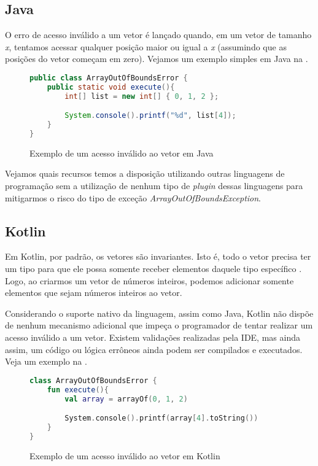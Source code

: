 \subsection{Java}

O erro de acesso inválido a um vetor é lançado quando, em um vetor de tamanho \textit{x}, tentamos acessar qualquer posição maior ou igual a \textit{x} (assumindo que as posições do vetor começam em zero). Vejamos um exemplo simples em Java na .

\begin{figure}[H]
    \centering
    \begin{lstlisting}[language=Java]
public class ArrayOutOfBoundsError {
    public static void execute(){
        int[] list = new int[] { 0, 1, 2 };

        System.console().printf("%d", list[4]);
    }
}
    \end{lstlisting}
    \caption{Exemplo de um acesso inválido ao vetor em Java}
    \label{fig:java_invalid_array_access}
\end{figure}

Vejamos quais recursos temos a disposição utilizando outras linguagens de programação sem a utilização de nenhum tipo de \textit{plugin} dessas linguagens para mitigarmos o risco do tipo de exceção \textit{ArrayOutOfBoundsException}.

\subsection{Kotlin}

Em Kotlin, por padrão, os vetores são invariantes. Isto é, todo o vetor precisa ter um tipo para que ele possa somente receber elementos daquele tipo específico \cite{kotlin_arrays}. Logo, ao criarmos um vetor de números inteiros, podemos adicionar somente elementos que sejam números inteiros ao vetor. 

Considerando o suporte nativo da linguagem, assim como Java, Kotlin não dispõe de nenhum mecanismo adicional que impeça o programador de tentar realizar um acesso inválido a um vetor. Existem validações realizadas pela IDE, mas ainda assim, um código ou lógica errôneos ainda podem ser compilados e executados. Veja um exemplo na .

\begin{figure}[H]
    \centering
    \begin{lstlisting}[language=Kotlin]
class ArrayOutOfBoundsError {
    fun execute(){
        val array = arrayOf(0, 1, 2)

        System.console().printf(array[4].toString())
    }
}
    \end{lstlisting}
    \caption{Exemplo de um acesso inválido ao vetor em Kotlin}
    \label{fig:kotlin_invalid_array_access}
\end{figure}

